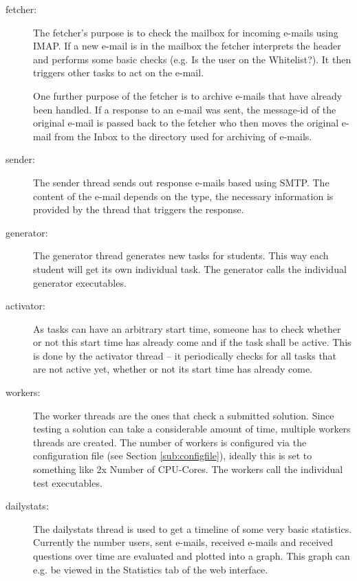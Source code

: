 \begin{description}
\item [fetcher: ] The fetcher's purpose is to check the mailbox for incoming 
    e-mails using IMAP. If a new e-mail is in the mailbox the fetcher
    interprets the header and performs some basic checks (e.g. Is the user on 
    the Whitelist?). It then triggers other tasks to act on the e-mail.

    One further purpose of the fetcher is to archive e-mails that have already
    been handled. If a response to an e-mail was sent, the message-id of the
    original e-mail is passed back to the fetcher who then moves the original
    e-mail from the Inbox to the directory used for archiving of e-mails.
\item [sender: ] The sender thread sends out response e-mails based using SMTP. 
    The content of the e-mail depends on the type, the necessary information 
    is provided by the thread that triggers the response.

\item [generator: ] The generator thread generates new tasks for students. This
    way each student will get its own individual task. The generator calls the
    individual generator executables.

\item [activator: ] As tasks can have an arbitrary start time, someone has to check
    whether or not this start time has already come and if the task shall
    be active. This is done by the activator thread -- it periodically checks
    for all tasks that are not active yet, whether or not its start time
    has already come.

\item [workers: ] The worker threads are the ones that check a submitted solution.
    Since testing a solution can take a considerable amount of time, multiple
    workers threads are created. The number of workers is configured via the
    configuration file (see Section \ref{sub:configfile}), ideally this is set
    to something like 2x Number of CPU-Cores. The workers call the
    individual test executables.
\item [dailystats: ] The dailystats thread is used to get a timeline of some very
    basic statistics. Currently the number users, sent e-mails, received e-mails
    and received questions over time are evaluated and plotted into a graph.
    This graph can e.g. be viewed in the Statistics tab of the web interface.
\end{description}

